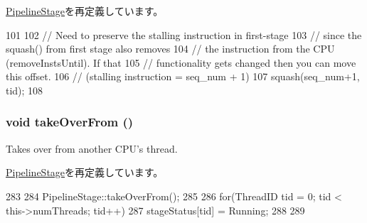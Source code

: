 \hyperlink{classPipelineStage_a960b60a46045a5363df0c263f0f43902}{PipelineStage}を再定義しています。


\begin{DoxyCode}
101 {
102     // Need to preserve the stalling instruction in first-stage
103     // since the squash() from first stage also removes
104     // the instruction from the CPU (removeInstsUntil). If that
105     // functionality gets changed then you can move this offset.
106     // (stalling instruction = seq_num + 1)
107     squash(seq_num+1, tid);
108 }
\end{DoxyCode}
\hypertarget{classFirstStage_a8674059ce345e23aac5086b2c3e24a43}{
\subsubsection[{takeOverFrom}]{\setlength{\rightskip}{0pt plus 5cm}void takeOverFrom ()}}
\label{classFirstStage_a8674059ce345e23aac5086b2c3e24a43}
Takes over from another CPU's thread. 

\hyperlink{classPipelineStage_a8674059ce345e23aac5086b2c3e24a43}{PipelineStage}を再定義しています。


\begin{DoxyCode}
283 {
284     PipelineStage::takeOverFrom();
285 
286     for(ThreadID tid = 0; tid < this->numThreads; tid++) {
287         stageStatus[tid] = Running;
288     }
289 }
\end{DoxyCode}


